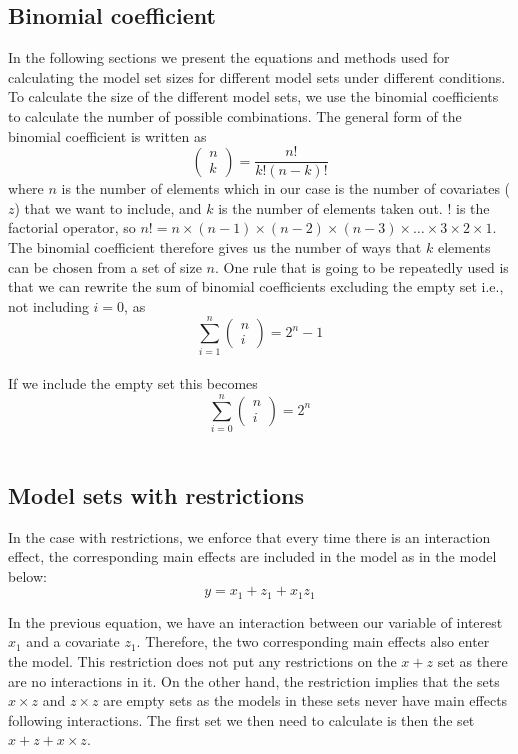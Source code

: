\subsection{Binomial coefficient}
\label{binomial}
In the following sections we present the equations and methods used for calculating the model set sizes for different model sets under different conditions. To calculate the size of the different model sets, we use the binomial coefficients to calculate the number of possible combinations. The general form of the binomial coefficient is written as
\[\left( \begin{array}{c}
n \\ 
k \end{array}
\right)=\frac{n!}{k!\left(n-k\right)!}\] 
where $n$ is the number of elements which in our case is the number of covariates ($z$) that we want to include, and $k$ is the number of elements taken out. $!$ is the factorial operator, so $n!=n\times \left(n-1\right)\times \left(n-2\right)\times \left(n-3\right)\times \dots \times 3\times 2\times 1$. The binomial coefficient therefore gives us the number of ways that $k$ elements can be chosen from a set of size $n$. One rule that is going to be repeatedly used is that we can rewrite the sum of binomial coefficients excluding the empty set i.e., not including $i=0$, as 
\[\sum^n_{i=1}{\left( \begin{array}{c}
n \\ 
i \end{array}
\right)}=2^n-1\] 
\\
If we include the empty set this becomes
\[\sum^n_{i=0}{\left( \begin{array}{c}
n \\ 
i \end{array}
\right)}=2^n\] 
\\

\subsection{Model sets with restrictions}
\label{with_res}
In the case with restrictions, we enforce that every time there is an interaction effect, the corresponding main effects are included in the model as in the model below:
\[y=x_1+z_1+x_1z_1\] 

In the previous equation, we have an interaction between our variable of interest $x_1$ and a covariate $z_1$. Therefore, the two corresponding main effects also enter the model. This restriction does not put any restrictions on the $x + z$ set as there are no interactions in it. On the other hand,  the restriction implies that the sets $x \times z$ and $z \times z$ are empty sets as the models in these sets never have main effects following interactions. The first set we then need to calculate is then the set $x + z + x \times z$.

